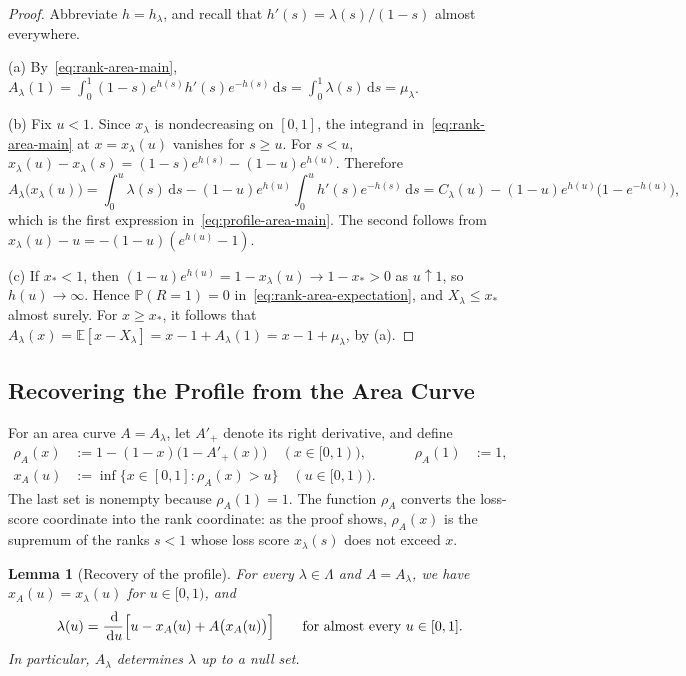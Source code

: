 \documentclass[11pt]{article}
\newtheorem{lemma}[theorem]{Lemma}
\theoremstyle{definition}
\theoremstyle{remark}
\newcommand{\Pp}{\mathbb P}
\newcommand{\E}{\mathbb E}
\newcommand{\dd}{\,\mathrm d}
\begin{document}
\begin{proof}
Abbreviate $h=h_\lambda$, and recall that $h'(s)=\lambda(s)/(1-s)$ almost everywhere.

(a)
By~\eqref{eq:rank-area-main}, $A_\lambda(1)=\int_0^1(1-s)e^{h(s)}h'(s)e^{-h(s)}\dd s=\int_0^1\lambda(s)\dd s=\mu_\lambda$.

(b)
Fix $u<1$.
Since $x_\lambda$ is nondecreasing on $[0,1]$, the integrand in~\eqref{eq:rank-area-main} at $x=x_\lambda(u)$ vanishes for $s\ge u$.
For $s<u$, $x_\lambda(u)-x_\lambda(s)=(1-s)e^{h(s)}-(1-u)e^{h(u)}$.
Therefore
\[
 A_\lambda\bigl(x_\lambda(u)\bigr)
 =\int_0^u\lambda(s)\dd s-(1-u)e^{h(u)}\int_0^uh'(s)e^{-h(s)}\dd s
 =C_\lambda(u)-(1-u)e^{h(u)}\bigl(1-e^{-h(u)}\bigr),
\]
which is the first expression in~\eqref{eq:profile-area-main}.
The second follows from $x_\lambda(u)-u=-(1-u)(e^{h(u)}-1)$.

(c)
If $x_*<1$, then $(1-u)e^{h(u)}=1-x_\lambda(u)\to1-x_*>0$ as $u\uparrow1$, so $h(u)\to\infty$.
Hence $\Pp(R=1)=0$ in~\eqref{eq:rank-area-expectation}, and $X_\lambda\le x_*$ almost surely.
For $x\ge x_*$, it follows that $A_\lambda(x)=\E[x-X_\lambda]=x-1+A_\lambda(1)=x-1+\mu_\lambda$, by (a).
\end{proof}

\subsection{Recovering the Profile from the Area Curve}

For an area curve $A=A_\lambda$, let $A'_+$ denote its right derivative, and define
\[
\begin{aligned}
 \rho_A(x)&:=1-(1-x)\bigl(1-A'_+(x)\bigr)\quad(x\in[0,1)),
 &\qquad \rho_A(1)&:=1,\\
 x_A(u)&:=\inf\{x\in[0,1]:\rho_A(x)>u\}\quad(u\in[0,1)).
\end{aligned}
\]
The last set is nonempty because $\rho_A(1)=1$.
The function $\rho_A$ converts the loss-score coordinate into the rank coordinate: as the proof shows, $\rho_A(x)$ is the supremum of the ranks $s<1$ whose loss score $x_\lambda(s)$ does not exceed $x$.

\begin{lemma}[Recovery of the profile]\label{lem:profile-recovery}
For every $\lambda\in\Lambda$ and $A=A_\lambda$, we have $x_A(u)=x_\lambda(u)$ for $u\in[0,1)$, and
\begin{equation}\label{eq:profile-recovery}
 \lambda(u)=\frac{\dd}{\dd u}\Bigl[u-x_A(u)+A\bigl(x_A(u)\bigr)\Bigr]
 \qquad\text{for almost every }u\in[0,1].
\end{equation}
In particular, $A_\lambda$ determines $\lambda$ up to a null set.
\end{lemma}
\end{document}
